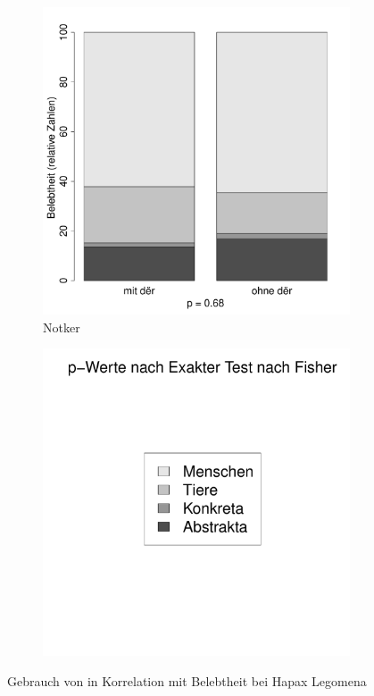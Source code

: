 \begin{figure}
\begin{subfigure}[b]{.5\linewidth}
  \includegraphics[width=6 cm]{generated/images/belebtheit-hapaxe-N}
\caption {Notker}
\end{subfigure}%
\begin{subfigure}[b]{.5\linewidth}
  \includegraphics[width=6 cm]{generated/images/belebtheit-legende}
\end{subfigure}
\caption{Gebrauch von  in Korrelation mit Belebtheit bei Hapax Legomena}\label{fig:bel-hapaxe}
\label{fig:residuals-bel-hapaxe}
\end{figure}




